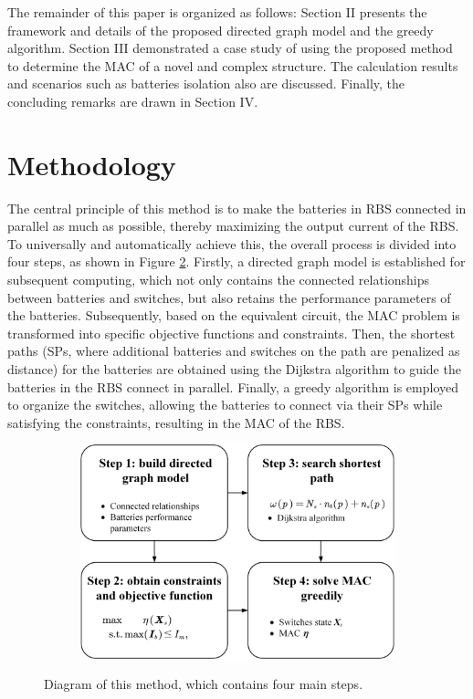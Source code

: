 \documentclass{article}
\begin{document}
The remainder of this paper is organized as follows: 
Section II presents the framework and details of the proposed directed graph model and the greedy algorithm. 
Section III demonstrated a case study of using the proposed method to determine the MAC of a novel and complex structure. 
The calculation results and scenarios such as batteries isolation also are discussed. 
Finally, the concluding remarks are drawn in Section IV.

\section{Methodology}

The central principle of this method is to make the batteries in RBS connected in parallel as much as possible, thereby maximizing the output current of the RBS.
To universally and automatically achieve this, the overall process is divided into four steps, as shown in Figure \ref{fig:main}.
Firstly, a directed graph model is established for subsequent computing, which not only contains the connected relationships between batteries and switches, but also retains the performance parameters of the batteries.
Subsequently, based on the equivalent circuit, the MAC problem is transformed into specific objective functions and constraints.
Then, the shortest paths (SPs, where additional batteries and switches on the path are penalized as distance) for the batteries are obtained using the Dijkstra algorithm to guide the batteries in the RBS connect in parallel.
Finally, a greedy algorithm is employed to organize the switches, allowing the batteries to connect via their SPs while satisfying the constraints, resulting in the MAC of the RBS.

\begin{figure}[htbp]
    \centering
    \begin{subfigure}[b]{0.8\textwidth}
        \includegraphics[width=\textwidth]{main}
        \caption{}
        \label{fig:main}
    \end{subfigure}
    \caption{ 
        Diagram of this method, which contains four main steps.
    }
\end{figure}
\end{document}
